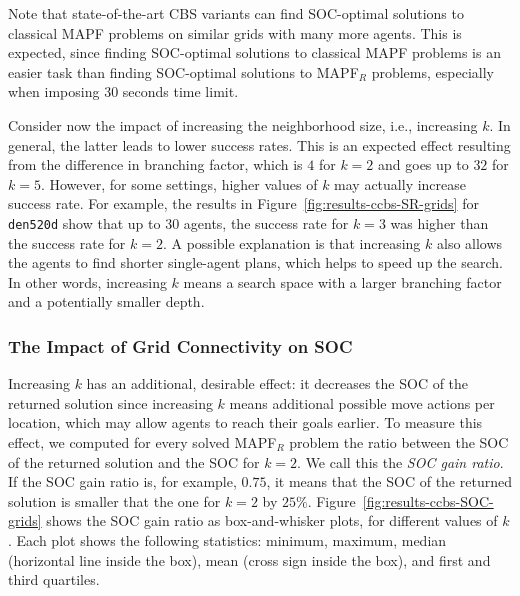 \documentclass[review]{elsarticle}
\newcommand\konstantin[1]{\nb{\textbf{Konstantin:}}{red}{#1}}
\newcommand\roni[1]{\nb{\textbf{Roni:}}{green}{#1}}
\newcommand{\ccbs}{\ac{CCBS}\xspace}
\newcommand{\cbs}{\ac{CBS}\xspace}
\newcommand{\mapfr}{\ac{MAPF}$_R$\xspace}
\newcommand{\smtccbs}{SMT-CCBS\xspace}
\newcommand{\mapf}{\ac{MAPF}\xspace}
\begin{document}
Note that state-of-the-art \cbs variants 
can find SOC-optimal solutions to classical \mapf problems on similar grids with many more agents. This is expected, since finding SOC-optimal solutions to classical \mapf problems is an easier task than finding SOC-optimal solutions to \mapfr problems, especially when imposing 30 seconds time limit. 



Consider now the impact of increasing the neighborhood size, i.e., increasing $k$. 
In general, the latter leads to lower success rates. This is an expected effect resulting from the difference in branching factor, which is $4$ for $k=2$ and goes up to $32$ for $k=5$. However, for some settings, higher values of $k$ may actually increase success rate. 
For example, the results in Figure~\ref{fig:results-ccbs-SR-grids} for \texttt{den520d} show that up to 30 agents, the success rate for $k=3$ was higher than the success rate for $k=2$.  
A possible explanation is that increasing $k$ also allows the agents to find shorter single-agent plans, which helps to speed up the search. In other words, increasing $k$ means a search space with a larger branching factor and a potentially smaller depth. %


\subsubsection{The Impact of Grid Connectivity on SOC}
Increasing $k$ has an additional, desirable effect: it decreases the SOC of the returned solution since increasing $k$ means additional possible move actions per location, which may allow agents to reach their goals earlier. To measure this effect, we computed for every solved \mapfr problem the ratio between the SOC of the returned solution and the SOC for $k=2$. 
We call this the \emph{SOC gain ratio}. 
If the SOC gain ratio is, for example, $0.75$, it means that the SOC of the returned solution is smaller that the one for $k=2$ by $25\%$. 
Figure~\ref{fig:results-ccbs-SOC-grids} shows the SOC gain ratio as box-and-whisker plots, for different values of $k$. Each plot shows the following statistics: minimum, maximum, median (horizontal line inside the box), mean (cross sign inside the box), and first and third quartiles. 
\end{document}
